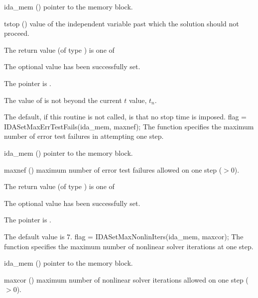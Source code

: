 {{}
{
  \begin{args}
  \item[ida\_mem] ()
    pointer to the {\ida} memory block.
  \item[tstop] ()
    value of the independent variable past which the solution should
    not proceed.
  \end{args}
}
{
  The return value  (of type ) is one of
  \begin{args}
  \item[\Id{IDA\_SUCCESS}]
    The optional value has been successfully set.
  \item[\Id{IDA\_MEM\_NULL}]
    The  pointer is .
  \item[\Id{IDA\_ILL\_INPUT}]
    The value of  is not beyond the current $t$ value, $t_n$.
  \end{args}
}
{
  The default, if this routine is not called, is that no stop time is imposed.
}
{
flag = IDASetMaxErrTestFails(ida\_mem, maxnef);
}
{
  The function  specifies the
  maximum number of error test failures in attempting one step.
}
{
  \begin{args}
  \item[ida\_mem] ()
    pointer to the {\ida} memory block.
  \item[maxnef] ()
    maximum number of error test failures allowed on one step ($>0$).
  \end{args}
}
{
  The return value  (of type ) is one of
  \begin{args}
  \item[\Id{IDA\_SUCCESS}]
    The optional value has been successfully set.
  \item[\Id{IDA\_MEM\_NULL}]
    The  pointer is .
  \end{args}
}
{
  The default value is $7$.
}
{
flag = IDASetMaxNonlinIters(ida\_mem, maxcor);
}
{
  The function  specifies the maximum
  number of nonlinear solver iterations at one step.
}
{
  \begin{args}
  \item[ida\_mem] ()
    pointer to the {\ida} memory block.
  \item[maxcor] ()
    maximum number of nonlinear solver iterations allowed on one step ($>0$).

\end{args}}}
